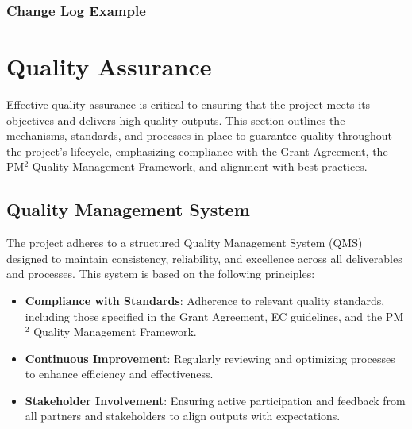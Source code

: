 \documentclass[a4paper,12pt]{article}
\begin{document}
\subsubsection*{Change Log Example}
\begin{table}[h!] 
    \centering 

\end{table}


\newpage

\section{\textcolor{EUblue}{Quality Assurance} }\label{sec:quality_assurance}

Effective quality assurance is critical to ensuring that the project meets its objectives and delivers high-quality outputs. This section outlines the mechanisms, standards, and processes in place to guarantee quality throughout the project’s lifecycle, emphasizing compliance with the Grant Agreement, the PM$^2$ Quality Management Framework, and alignment with best practices.


\subsection{\textcolor{EUblue}{Quality Management System}}

The project adheres to a structured Quality Management System (QMS) designed to maintain consistency, reliability, and excellence across all deliverables and processes. This system is based on the following principles:

\begin{itemize}[left=1em, itemsep=0pt, topsep=0pt]
    \item \textbf{Compliance with Standards}: Adherence to relevant quality standards, including those specified in the Grant Agreement, EC guidelines, and the PM$^2$ Quality Management Framework. 
    \item \textbf{Continuous Improvement}: Regularly reviewing and optimizing processes to enhance efficiency and effectiveness.
    \item \textbf{Stakeholder Involvement}: Ensuring active participation and feedback from all partners and stakeholders to align outputs with expectations.
\end{itemize}
\end{document}
